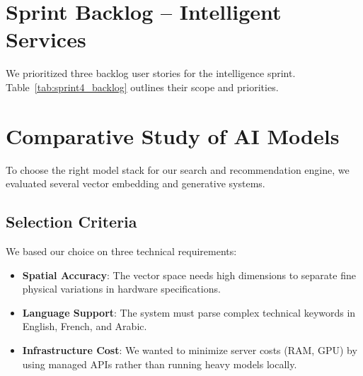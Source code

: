 \documentclass[12pt,a4paper]{report}
\begin{document}
\section{Sprint Backlog -- Intelligent Services}

We prioritized three backlog user stories for the intelligence sprint. Table~\ref{tab:sprint4_backlog} outlines their scope and priorities.

\renewcommand{\arraystretch}{1.3}
\setlength{\tabcolsep}{8pt}

\begin{table}[!htbp]
\centering
\caption{User stories for Release 4 (Intelligent Services)}
\label{tab:sprint4_backlog}
\end{table}

\section{Comparative Study of AI Models}

To choose the right model stack for our search and recommendation engine, we evaluated several vector embedding and generative systems.

\subsection{Selection Criteria}

We based our choice on three technical requirements:
\begin{itemize}
    \item \textbf{Spatial Accuracy}: The vector space needs high dimensions to separate fine physical variations in hardware specifications.
    \item \textbf{Language Support}: The system must parse complex technical keywords in English, French, and Arabic.
    \item \textbf{Infrastructure Cost}: We wanted to minimize server costs (RAM, GPU) by using managed APIs rather than running heavy models locally.
\end{itemize}
\end{document}
